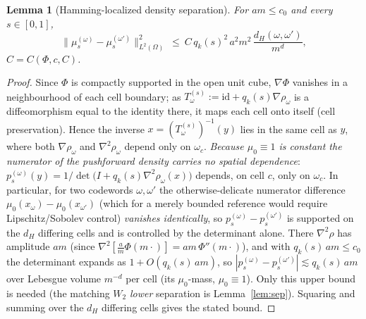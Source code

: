 \documentclass[10pt,a4paper]{amsart}
\newtheorem{lemma}{Lemma}
\begin{document}
\begin{lemma}[Hamming-localized density separation]\label{lem:kl}
For $am\le c_0$ and every $s\in[0,1]$,
\[
  \big\|\mu_s^{(\omega)}-\mu_s^{(\omega')}\big\|_{L^2(\Omega)}^2\ \le\ C\,q_k(s)^2\,a^2 m^2\,\frac{d_H(\omega,\omega')}{m^d},
\]
$C=C(\Phi,c,C)$.
\end{lemma}

\begin{proof}
Since $\Phi$ is compactly supported in the open unit cube, $\nabla\Phi$ vanishes in a neighbourhood
of each cell boundary; as $T^{(s)}_\omega:=\mathrm{id}+q_k(s)\nabla\rho_\omega$ is a diffeomorphism
equal to the identity there, it maps each cell onto itself (cell preservation). Hence the inverse
$x=(T^{(s)}_\omega)^{-1}(y)$ lies in the same cell as $y$, where both $\nabla\rho_\omega$ and
$\nabla^2\rho_\omega$ depend only on $\omega_c$. \emph{Because $\mu_0\equiv1$ is constant the
numerator of the pushforward density carries no spatial dependence}:
$p_s^{(\omega)}(y)=1/\det\!\big(I+q_k(s)\nabla^2\rho_\omega(x)\big)$ depends, on cell $c$, only on
$\omega_c$. In particular, for two codewords $\omega,\omega'$ the otherwise-delicate numerator
difference $\mu_0(x_\omega)-\mu_0(x_{\omega'})$ (which for a merely bounded reference would require
Lipschitz/Sobolev control) \emph{vanishes identically}, so $p_s^{(\omega)}-p_s^{(\omega')}$ is
supported on the $d_H$ differing cells and is controlled by the determinant alone. There
$\nabla^2\rho$ has amplitude $am$ (since $\nabla^2[\tfrac{a}{m}\Phi(m\cdot)]=am\,\Phi''(m\cdot)$), and
with $q_k(s)\,am\le c_0$ the determinant expands as $1+O(q_k(s)\,am)$, so
$|p_s^{(\omega)}-p_s^{(\omega')}|\lesssim q_k(s)\,am$ over Lebesgue volume $m^{-d}$ per cell (its
$\mu_0$-mass, $\mu_0\equiv1$). Only this upper bound is needed (the matching $W_2$ \emph{lower}
separation is Lemma~\ref{lem:sep}). Squaring and summing over the $d_H$ differing cells gives the
stated bound.
\end{proof}
\end{document}

